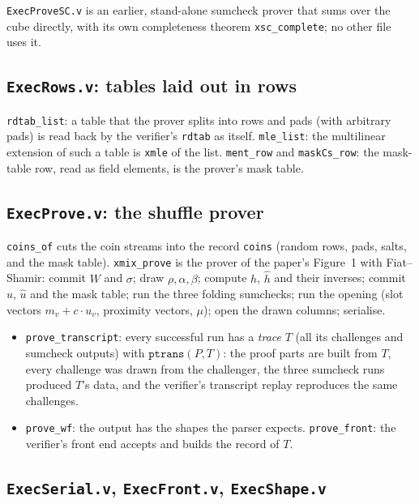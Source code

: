 \documentclass[11pt,a4paper]{article}
\newcommand{\uh}{\hat{u}}
\newcommand{\hh}{\hat{h}}
\theoremstyle{definition}
\theoremstyle{plain}
\begin{document}
\texttt{ExecProveSC.v} is an earlier, stand-alone sumcheck prover that sums over the cube directly,
with its own completeness theorem \texttt{xsc\_complete}; no other file uses it.

\subsection{\texttt{ExecRows.v}: tables laid out in rows}

\texttt{rdtab\_list}: a table that the prover splits into rows and pads (with arbitrary pads) is read
back by the verifier's \texttt{rdtab} as itself. \texttt{mle\_list}: the multilinear extension of such
a table is \texttt{xmle} of the list. \texttt{ment\_row} and \texttt{maskCs\_row}: the mask-table row,
read as field elements, is the prover's mask table.

\subsection{\texttt{ExecProve.v}: the shuffle prover}

\texttt{coins\_of} cuts the coin streams into the record \texttt{coins} (random rows, pads, salts, and
the mask table). \texttt{xmix\_prove} is the prover of the paper's Figure~1 with Fiat--Shamir: commit
$W$ and $\sigma$; draw $\rho,\alpha,\beta$; compute $h$, $\hh$ and their inverses; commit $u$, $\uh$ and
the mask table; run the three folding sumchecks; run the opening (slot vectors
$m_v+c\cdot u_v$, proximity vectors, $\mu$); open the drawn columns; serialise.
\begin{itemize}[leftmargin=1.3em]
\item \texttt{prove\_transcript}: every successful run has a \emph{trace} $T$ (all its challenges and
  sumcheck outputs) with $\mathtt{ptrans}(P,T)$: the proof parts are built from $T$, every challenge was
  drawn from the challenger, the three sumcheck runs produced $T$'s data, and the verifier's
  transcript replay reproduces the same challenges.
\item \texttt{prove\_wf}: the output has the shapes the parser expects. \texttt{prove\_front}: the
  verifier's front end accepts and builds the record of $T$.
\end{itemize}

\subsection{\texttt{ExecSerial.v}, \texttt{ExecFront.v}, \texttt{ExecShape.v}}
\end{document}
